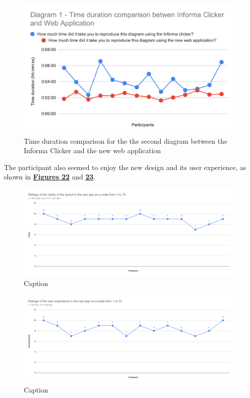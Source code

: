 \documentclass[]{usiinfbachelorproject}
\begin{document}
\begin{figure}[h!]
\centering
\includegraphics[scale=0.7]{figures/diagram1-time-comparison.png}
\caption {Time duration comparison for the the second diagram between the Informa Clicker and the new web application}
\end{figure}

\noindent The participant also seemed to enjoy the new design and its user experience, as shown in \hyperref[clarity]{\textbf{Figures 22}} and \hyperref[ux-ratings]{\textbf{23}}. 

\begin{figure}[h!]
\centering
\includegraphics[width=\textwidth]{figures/clarity-ratings.png}
\caption {Caption}
\label{clarity}
\end{figure}

\begin{figure}[h!]
\centering
\includegraphics[width=\textwidth]{figures/ux-ratings.png}
\caption {Caption}
\label{ux-ratings}
\end{figure}
\end{document}
